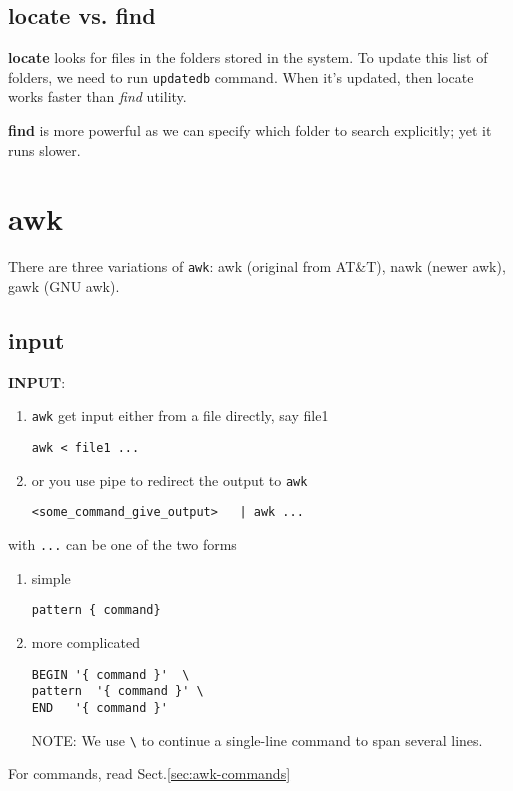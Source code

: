 %   

\subsection{locate vs. find}

{\bf locate} looks for files in the folders stored in the system. To update this
list of folders, we need to run \verb!updatedb! command. When it's updated, then
locate works faster than {\it find} utility.


{\bf find} is more powerful as we can specify which folder to search
explicitly; yet it runs slower.

\section{awk}
\label{sec:awk}

There are three variations of \verb!awk!: awk (original from AT\&T), nawk
(newer awk), gawk (GNU awk). 


\subsection{input}

{\bf INPUT}:
\begin{enumerate}
  \item \verb!awk! get input either from a file directly, say file1
\begin{verbatim}
awk < file1 ...
\end{verbatim}

  \item or you use pipe to redirect the output to \verb!awk! 
  
\begin{verbatim}
<some_command_give_output>   | awk ...
\end{verbatim}

\end{enumerate}
with \verb!...! can be one of the two forms
\begin{enumerate}
  \item simple
\begin{verbatim}
pattern { command}
\end{verbatim}
   
   \item more complicated
\begin{verbatim}
BEGIN '{ command }'  \
pattern  '{ command }' \
END   '{ command }'      
\end{verbatim}
NOTE: We use \verb!\! to continue a single-line command to span several lines.

\end{enumerate}
For commands, read Sect.\ref{sec:awk-commands}

